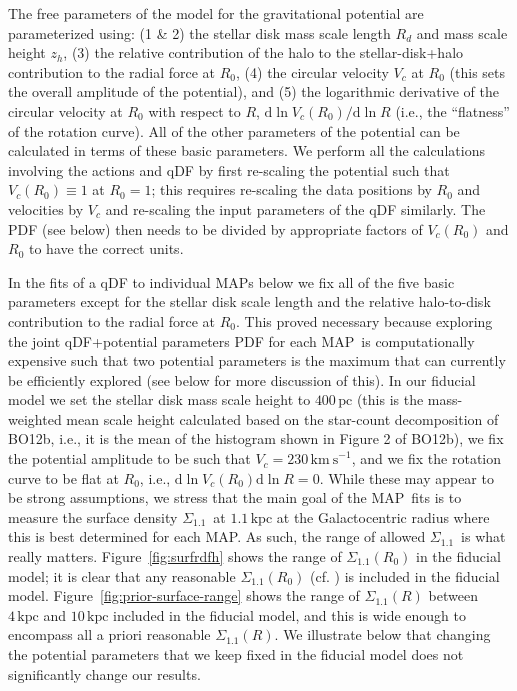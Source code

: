 \documentclass{emulateapj}
\newcommand{\ie}{i.e.}
\newcommand{\dd}{\mathrm{d}}
\renewcommand{\figurename}{Figure}
\newcommand{\map}{MAP}
\newcommand{\kpc}{\ensuremath{\,\mathrm{kpc}}}
\newcommand{\pc}{\ensuremath{\,\mathrm{pc}}}
\newcommand{\kms}{\ensuremath{\,\mathrm{km\ s}^{-1}}}
\newcommand{\sigoneone}{\ensuremath{\Sigma_{1.1}}}
\newcommand{\bo}{BO12}
\begin{document}
The free parameters of the model for the gravitational potential are
parameterized using: (1 \& 2) the stellar disk mass scale length $R_d$
and mass scale height $z_h$, (3) the relative contribution of the halo
to the stellar-disk+halo contribution to the radial force at $R_0$,
(4) the circular velocity $V_c$ at $R_0$ (this sets the overall
amplitude of the potential), and (5) the logarithmic derivative of the
circular velocity at $R_0$ with respect to $R$, $\dd \ln V_c (R_0) /
\dd \ln R$ (\ie, the ``flatness'' of the rotation curve). All of the
other parameters of the potential can be calculated in terms of these
basic parameters. We perform all the calculations involving the
actions and qDF by first re-scaling the potential such that $V_c(R_0)
\equiv 1$ at $R_0 = 1$; this requires re-scaling the data positions by
$R_0$ and velocities by $V_c$ and re-scaling the input parameters of
the qDF similarly. The PDF (see below) then needs to be divided by
appropriate factors of $V_c(R_0)$ and $R_0$ to have the correct units.

In the fits of a qDF to individual \map s below we fix all of the five
basic parameters except for the stellar disk scale length and the
relative halo-to-disk contribution to the radial force at $R_0$. This
proved necessary because exploring the joint qDF+potential parameters
PDF for each \map\ is computationally expensive such that two
potential parameters is the maximum that can currently be efficiently
explored (see below for more discussion of this). In our fiducial
model we set the stellar disk mass scale height to $400\pc$ (this is
the mass-weighted mean scale height calculated based on the star-count
decomposition of \bo b, \ie, it is the mean of the histogram shown in
Figure 2 of \bo b), we fix the potential amplitude to be such that
$V_c = 230\kms$, and we fix the rotation curve to be flat at $R_0$,
\ie, $\dd \ln V_c(R_0) \dd \ln R = 0$. While these may appear to be
strong assumptions, we stress that the main goal of the \map\ fits is
to measure the surface density \sigoneone\ at $1.1\kpc$ at the
Galactocentric radius where this is best determined for each \map. As
such, the range of allowed \sigoneone\ is what really
matters. \figurename~\ref{fig:surfrdfh} shows the range of
$\sigoneone(R_0)$ in the fiducial model; it is clear that any
reasonable $\sigoneone(R_0)$ (cf. \citealt{BovyTremaine,Zhang13a}) is
included in the fiducial
model. \figurename~\ref{fig:prior-surface-range} shows the range of
$\sigoneone(R)$ between $4\kpc$ and $10\kpc$ included in the fiducial
model, and this is wide enough to encompass all a priori reasonable
$\sigoneone(R)$. We illustrate below that changing the potential
parameters that we keep fixed in the fiducial model does not
significantly change our results.
\end{document}
